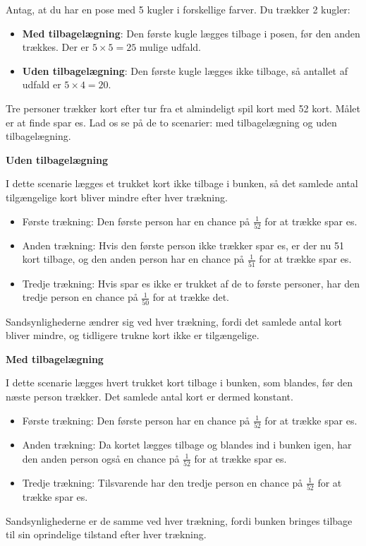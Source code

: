 \begin{example}
    Antag, at du har en pose med 5 kugler i forskellige farver. Du trækker 2 kugler:
\begin{itemize}
    \item \textbf{Med tilbagelægning}: Den første kugle lægges tilbage i posen, før den anden trækkes. Der er \(5 \times 5 = 25\) mulige udfald.
    \item \textbf{Uden tilbagelægning}: Den første kugle lægges ikke tilbage, så antallet af udfald er \(5 \times 4 = 20\).
\end{itemize}
\end{example}

\begin{example}
    Tre personer trækker kort efter tur fra et almindeligt spil kort med 52 kort. Målet er at finde spar es. Lad os se på de to scenarier: med tilbagelægning og uden tilbagelægning.

    \textbf{Uden tilbagelægning}

    I dette scenarie lægges et trukket kort ikke tilbage i bunken, så det samlede antal tilgængelige kort bliver mindre efter hver trækning.
    \begin{itemize}
        \item Første trækning: Den første person har en chance på $\frac{1}{52}$ for at trække spar es.
        \item Anden trækning: Hvis den første person ikke trækker spar es, er der nu 51 kort tilbage, og den anden person har en chance på $\frac{1}{51}$ for at trække spar es.
        \item Tredje trækning: Hvis spar es ikke er trukket af de to første personer, har den tredje person en chance på $\frac{1}{50}$ for at trække det.
    \end{itemize}
    
    Sandsynlighederne ændrer sig ved hver trækning, fordi det samlede antal kort bliver mindre, og tidligere trukne kort ikke er tilgængelige.
    
    \textbf{Med tilbagelægning}

    I dette scenarie lægges hvert trukket kort tilbage i bunken, som blandes, før den næste person trækker. Det samlede antal kort er dermed konstant.
    \begin{itemize}
        \item Første trækning: Den første person har en chance på $\frac{1}{52}$ for at trække spar es.
        \item Anden trækning: Da kortet lægges tilbage og blandes ind i bunken igen, har den anden person også en chance på $\frac{1}{52}$ for at trække spar es.
        \item Tredje trækning: Tilsvarende har den tredje person en chance på $\frac{1}{52}$ for at trække spar es.
    \end{itemize}
    
    Sandsynlighederne er de samme ved hver trækning, fordi bunken bringes tilbage til sin oprindelige tilstand efter hver trækning.

\end{example}

